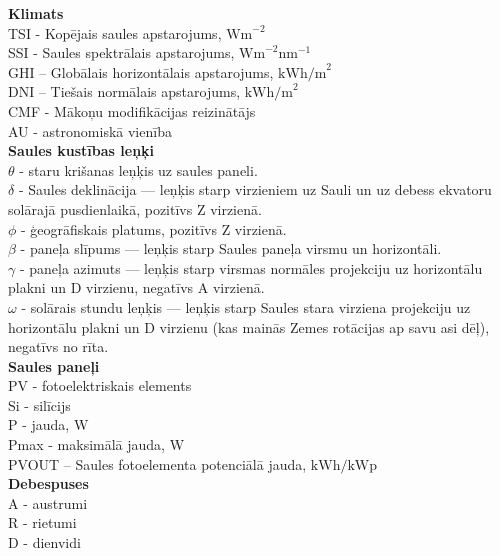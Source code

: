 \noindent 
\textbf{Klimats}\\
TSI - Kopējais saules apstarojums, $\textrm{Wm}^{-2}$\\
SSI - Saules spektrālais apstarojums, $\textrm{Wm}^{-2}\textrm{nm}^{-1}$\\
GHI – Globālais horizontālais apstarojums,  $\textrm{kWh/m}^2$\\ %
DNI – Tiešais normālais apstarojums, $\textrm{kWh/m}^2$\\ %
CMF - Mākoņu modifikācijas reizinātājs\\
AU - astronomiskā vienība\\  %
\textbf{Saules kustības leņķi}\\
$\theta$ - staru krišanas leņķis uz saules paneli.\\
$\delta$ - Saules deklinācija --- leņķis starp virzieniem uz Sauli un uz debess ekvatoru solārajā pusdienlaikā, pozitīvs Z virzienā.\\
 $\phi$  - ģeogrāfiskais platums, pozitīvs Z virzienā.\\
$\beta$  - paneļa slīpums --- leņķis starp Saules paneļa virsmu un horizontāli.\\
$\gamma$ - paneļa azimuts --- leņķis starp virsmas normāles projekciju uz horizontālu  plakni un D virzienu, negatīvs A virzienā.\\
$\omega$ - solārais stundu leņķis --- leņķis starp Saules stara virziena projekciju uz horizontālu plakni un D virzienu (kas mainās Zemes rotācijas ap  savu asi dēļ), negatīvs no rīta.\\
\textbf{Saules paneļi}\\
PV - fotoelektriskais elements\\ %
Si - silīcijs\\
P - jauda, 	W\\
Pmax - maksimālā jauda, W\\
PVOUT – Saules fotoelementa potenciālā jauda, $\textrm{kWh/kWp}$\\ %
\textbf{Debespuses}\\
A - austrumi\\
R - rietumi\\
D - dienvidi\\